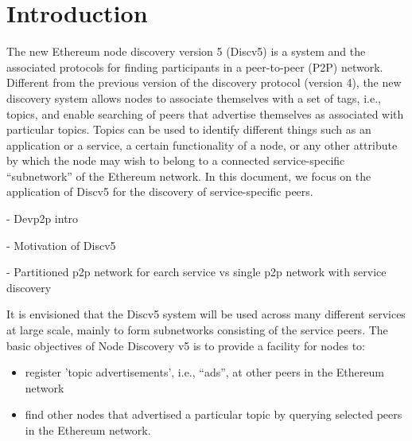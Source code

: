 
\section{Introduction}


The new Ethereum node discovery version 5 (Discv5) is a system and the associated protocols for finding participants in a peer-to-peer (P2P) network. Different from the previous version of the discovery protocol (version 4), the new discovery system allows nodes to associate themselves with a set of tags, i.e., topics, and enable searching of peers that advertise themselves as associated with particular topics. Topics can be used to identify different things such as an application or a service, a certain functionality of a node, or any other attribute by which the node may wish to belong to a connected service-specific “subnetwork” of the Ethereum network. In this document, we focus on the application of Discv5 for the discovery of service-specific peers.

-  Devp2p intro

- Motivation of Discv5

- Partitioned p2p network for earch service vs single p2p network with service discovery

It is envisioned that the Discv5 system will be used across many different services at large scale, mainly to form subnetworks consisting of the service peers. The basic objectives of Node Discovery v5 is to provide a facility for nodes to:
\begin{itemize}
    \item register 'topic advertisements', i.e., “ads”, at other peers in the Ethereum network
    \item find other nodes that advertised a particular topic by querying selected peers in the Ethereum network.
\end{itemize}

    
    
